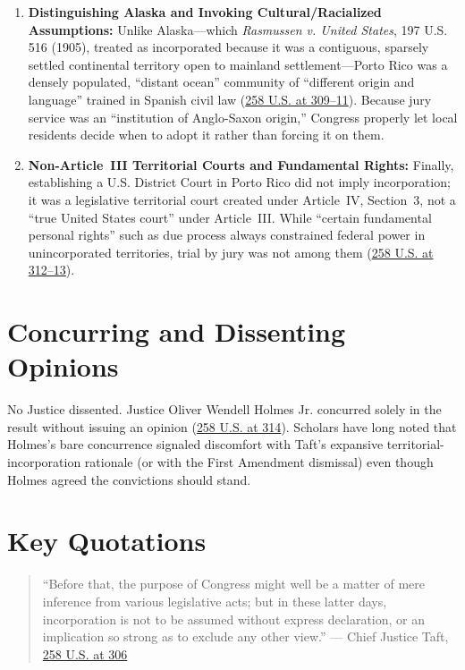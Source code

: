 \documentclass[12pt]{article}
\begin{document}
\begin{enumerate}
  \item \textbf{Distinguishing Alaska and Invoking Cultural/Racialized Assumptions:} Unlike Alaska---which \textit{Rasmussen v. United States}, 197 U.S. 516 (1905), treated as incorporated because it was a contiguous, sparsely settled continental territory open to mainland settlement---Porto Rico was a densely populated, ``distant ocean'' community of ``different origin and language'' trained in Spanish civil law (\href{https://en.wikisource.org/wiki/Balzac_v._Porto_Rico/Opinion_of_the_Court}{258 U.S. at 309--11}). Because jury service was an ``institution of Anglo-Saxon origin,'' Congress properly let local residents decide when to adopt it rather than forcing it on them.
  \item \textbf{Non-Article~III Territorial Courts and Fundamental Rights:} Finally, establishing a U.S. District Court in Porto Rico did not imply incorporation; it was a legislative territorial court created under Article~IV, Section~3, not a ``true United States court'' under Article~III. While ``certain fundamental personal rights'' such as due process always constrained federal power in unincorporated territories, trial by jury was not among them (\href{https://en.wikisource.org/wiki/Balzac_v._Porto_Rico/Opinion_of_the_Court}{258 U.S. at 312--13}).
\end{enumerate}

\section{Concurring and Dissenting Opinions}
No Justice dissented. Justice Oliver Wendell Holmes Jr. concurred solely in the result without issuing an opinion (\href{https://supreme.justia.com/cases/federal/us/258/298/}{258 U.S. at 314}). Scholars have long noted that Holmes's bare concurrence signaled discomfort with Taft's expansive territorial-incorporation rationale (or with the First Amendment dismissal) even though Holmes agreed the convictions should stand.

\section{Key Quotations}
\begin{quote}
``Before that, the purpose of Congress might well be a matter of mere inference from various legislative acts; but in these latter days, incorporation is not to be assumed without express declaration, or an implication so strong as to exclude any other view.'' --- Chief Justice Taft, \href{https://supreme.justia.com/cases/federal/us/258/298/}{258 U.S. at 306}
\end{quote}
\end{document}
